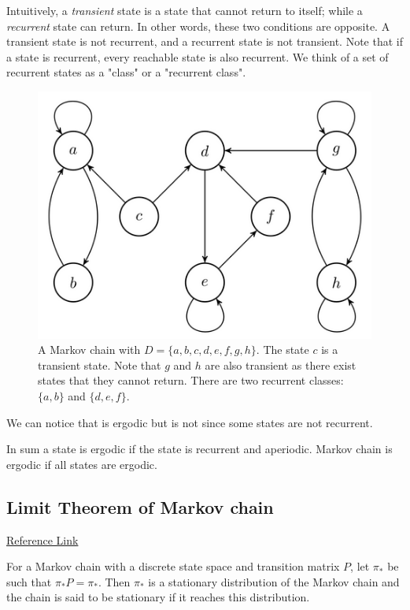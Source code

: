 Intuitively, a \textit{transient} state is a state that cannot return to itself; while a \textit{recurrent} state can return. In other words, these two conditions are opposite. A transient state is not recurrent, and a recurrent state is not transient. Note that if a state is recurrent, every reachable state is also recurrent. We think of a set of recurrent states as a "class" or a "recurrent class".
\begin{figure}[h]
	\centering
	\includegraphics[scale=0.7]{./images/mcmc/markov_chain.png}
	\caption{A Markov chain with $D = \{a, b, c, d, e, f, g, h\}$. The state $c$ is a transient state. Note that $g$ and $h$ are also transient as there exist states that they cannot return. There are two recurrent classes: $\{a, b\}$ and $\{d, e, f\}$.}
	\label{fig:markov_chain_2}
\end{figure}
We can notice that  is ergodic but  is not since some states are not recurrent. 

In sum a state is ergodic if the state is recurrent and aperiodic. Markov chain is ergodic if all states are ergodic. 


\subsection{Limit Theorem of Markov chain}
\href{https://bookdown.org/rdpeng/advstatcomp/background.html}{Reference Link}

For a Markov chain with a discrete state space and transition matrix $P$, let $\pi_*$ be such that $\pi_*P=\pi_*$. Then $\pi_*$ is a stationary distribution of the Markov chain and the chain is said to be stationary if it reaches this distribution.

